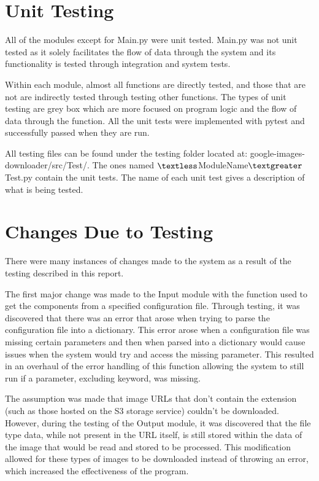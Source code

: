 \documentclass[12pt, titlepage]{article}
\begin{document}
\section{Unit Testing}

All of the modules except for Main.py were unit tested. Main.py was not unit tested as it solely facilitates the flow of data through the system and its functionality is tested through integration and system tests.

Within each module, almost all functions are directly tested, and those that are not are indirectly tested through testing other functions. The types of unit testing are grey box which are more focused on program logic and the flow of data through the function. All the unit tests were implemented with pytest and successfully passed when they are run.

All testing files can be found under the testing folder located at: google-images-downloader/src/Test/. The ones named $\textless$ModuleName$\textgreater$Test.py contain the unit tests. The name of each unit test gives a description of what is being tested.

\section{Changes Due to Testing}

There were many instances of changes made to the system as a result of the testing described in this report.

The first major change was made to the Input module with the function used to get the components from a specified configuration file. Through testing, it was discovered that there was an error that arose when trying to parse the configuration file into a dictionary. This error arose when a configuration file was missing certain parameters and then when parsed into a dictionary would cause issues when the system would try and access the missing parameter. This resulted in an overhaul of the error handling of this function allowing the system to still run if a parameter, excluding keyword, was missing.

The assumption was made that image URLs that don't contain the extension (such as those hosted on the S3 storage service) couldn't be downloaded. However, during the testing of the Output module, it was discovered that the file type data, while not present in the URL itself, is still stored within the data of the image that would be read and stored to be processed. This modification allowed for these types of images to be downloaded instead of throwing an error, which increased the effectiveness of the program.
\end{document}
